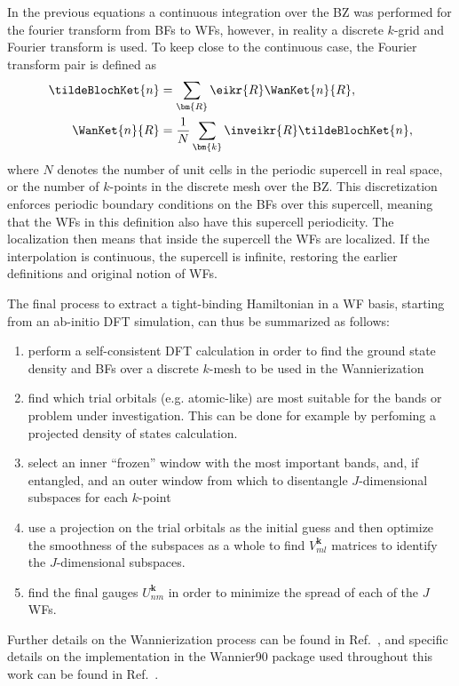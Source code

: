 In the previous equations a continuous integration over the BZ was performed for the fourier transform from BFs to WFs, however, in reality a discrete $k$-grid and Fourier transform is used.
To keep close to the continuous case, the Fourier transform pair is defined as
\begin{align}
	\tildeBlochKet{n} &= \sum_{\bm{R}} \eikr{R} \WanKet{n}{R},\label{eq:Theory_wantok}\\
	\WanKet{n}{R} &= \frac{1}{N}\sum_{\bm{k}} \inveikr{R} \tildeBlochKet{n},
\end{align}
where $N$ denotes the number of unit cells in the periodic supercell in real space, or the number of $k$-points in the discrete mesh over the BZ.
This discretization enforces periodic boundary conditions on the BFs over this supercell, meaning that the WFs in this definition also have this supercell periodicity.
The localization then means that inside the supercell the WFs are localized.
If the interpolation is continuous, the supercell is infinite, restoring the earlier definitions and original notion of WFs.

The final process to extract a tight-binding Hamiltonian in a WF basis, starting from an ab-initio DFT simulation, can thus be summarized as follows:
\begin{enumerate}
	\item perform a self-consistent DFT calculation in order to find the ground state density and BFs over a discrete $k$-mesh to be used in the Wannierization
	\item find which trial orbitals (e.g. atomic-like) are most suitable for the bands or problem under investigation. This can be done for example by perfoming a projected density of states calculation.
	\item select an inner ``frozen'' window with the most important bands, and, if entangled, and an outer window from which to disentangle $J$-dimensional subspaces for each $k$-point
	\item use a projection on the trial orbitals as the initial guess and then optimize the smoothness of the subspaces as a whole to find $V_{ml}^{\bm{k}}$ matrices to identify the $J$-dimensional subspaces.
	\item find the final gauges $U_{nm}^{\bm{k}}$ in order to minimize the spread of each of the $J$ WFs.
\end{enumerate}

Further details on the Wannierization process can be found in Ref.~\cite{Marzari2012}, and specific details on the implementation in the Wannier90 package used throughout this work can be found in Ref.~\cite{Mostofi2014AnFunctions}.

